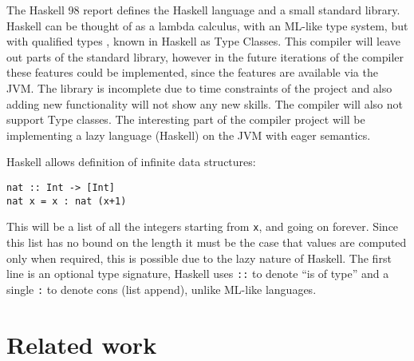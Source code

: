 \documentclass[float=false, crop=false]{standalone}
\begin{document}
The Haskell 98 \cite{haskell98-spec} report defines the Haskell language 
and a small standard library.
Haskell can be thought of as a lambda calculus, with an ML-like type system,
but with qualified types \cite{qualified-types}, known in 
Haskell as Type Classes. This compiler will
leave out parts of the standard library, however in the future 
iterations of the compiler these 
features could be implemented, since the features are available via the JVM.
The library is incomplete due to time constraints of the project and
also adding new functionality will not show any new skills.
The compiler will also not support Type classes. The interesting
part of the compiler project will be implementing a lazy language (Haskell)
on the JVM with eager semantics.

Haskell allows definition of infinite data structures:

\begin{lstlisting}
nat :: Int -> [Int]
nat x = x : nat (x+1)
\end{lstlisting}

This will be a list of all the integers starting from \texttt{x}, 
and going on forever. Since this list has no 
bound on the length it must be the case that values are computed
only when required, this is possible due to the lazy nature
of Haskell. The first line is an optional type signature, Haskell
uses \verb|::| to denote ``is of type'' and a single \verb|:| to denote cons (list
append), unlike ML-like languages.




  

\section{Related work}
\end{document}
